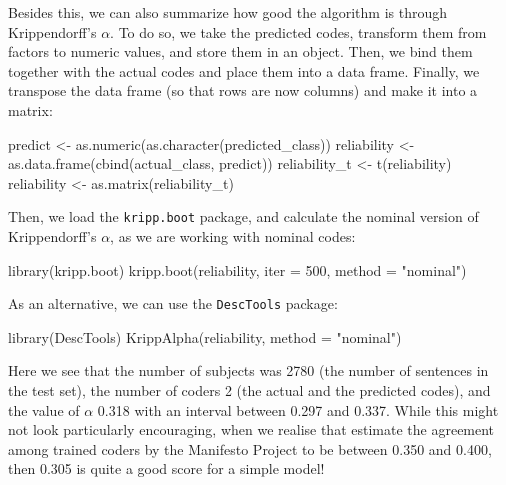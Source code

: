 \documentclass[
]{article}
\newenvironment{Shaded}{\begin{snugshade}}{\end{snugshade}}
\newcommand{\AttributeTok}[1]{\textcolor[rgb]{0.77,0.63,0.00}{#1}}
\newcommand{\DecValTok}[1]{\textcolor[rgb]{0.00,0.00,0.81}{#1}}
\newcommand{\FunctionTok}[1]{\textcolor[rgb]{0.00,0.00,0.00}{#1}}
\newcommand{\NormalTok}[1]{#1}
\newcommand{\OtherTok}[1]{\textcolor[rgb]{0.56,0.35,0.01}{#1}}
\newcommand{\StringTok}[1]{\textcolor[rgb]{0.31,0.60,0.02}{#1}}
\begin{document}
Besides this, we can also summarize how good the algorithm is through Krippendorff's \(\alpha\). To do so, we take the predicted codes, transform them from factors to numeric values, and store them in an object. Then, we bind them together with the actual codes and place them into a data frame. Finally, we transpose the data frame (so that rows are now columns) and make it into a matrix:

\begin{Shaded}
\begin{Highlighting}[]
\NormalTok{predict }\OtherTok{\textless{}{-}} \FunctionTok{as.numeric}\NormalTok{(}\FunctionTok{as.character}\NormalTok{(predicted\_class))}
\NormalTok{reliability }\OtherTok{\textless{}{-}} \FunctionTok{as.data.frame}\NormalTok{(}\FunctionTok{cbind}\NormalTok{(actual\_class, predict))}
\NormalTok{reliability\_t }\OtherTok{\textless{}{-}} \FunctionTok{t}\NormalTok{(reliability)}
\NormalTok{reliability }\OtherTok{\textless{}{-}} \FunctionTok{as.matrix}\NormalTok{(reliability\_t)}
\end{Highlighting}
\end{Shaded}

Then, we load the \texttt{kripp.boot} package, and calculate the nominal version of Krippendorff's \(\alpha\), as we are working with nominal codes:

\begin{Shaded}
\begin{Highlighting}[]
\FunctionTok{library}\NormalTok{(kripp.boot)}
\FunctionTok{kripp.boot}\NormalTok{(reliability, }\AttributeTok{iter =} \DecValTok{500}\NormalTok{, }\AttributeTok{method =} \StringTok{"nominal"}\NormalTok{)}
\end{Highlighting}
\end{Shaded}

As an alternative, we can use the \texttt{DescTools} package:

\begin{Shaded}
\begin{Highlighting}[]
\FunctionTok{library}\NormalTok{(DescTools)}
\FunctionTok{KrippAlpha}\NormalTok{(reliability, }\AttributeTok{method =} \StringTok{"nominal"}\NormalTok{)}
\end{Highlighting}
\end{Shaded}

Here we see that the number of subjects was 2780 (the number of sentences in the test set), the number of coders 2 (the actual and the predicted codes), and the value of \(\alpha\) 0.318 with an interval between 0.297 and 0.337. While this might not look particularly encouraging, when we realise that \textcite{Mikhaylov2012a} estimate the agreement among trained coders by the Manifesto Project to be between 0.350 and 0.400, then 0.305 is quite a good score for a simple model!
\end{document}

